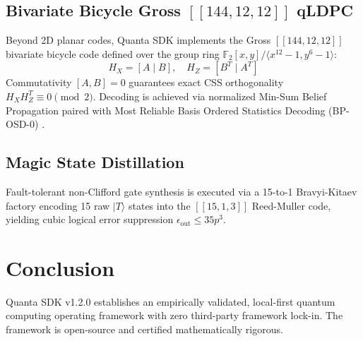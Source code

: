 \documentclass[aps,pra,reprint,superscriptaddress,amsmath,amssymb,floatfix]{revtex4-2}
\begin{document}
\subsection{Bivariate Bicycle Gross $[[144, 12, 12]]$ qLDPC}
Beyond 2D planar codes, Quanta SDK implements the Gross $[[144, 12, 12]]$ bivariate bicycle code \cite{bravyi2024high} defined over the group ring $\mathbb{F}_2[x,y]/\langle x^{12}-1, y^6-1\rangle$:
\begin{equation}
    H_X = [A \mid B], \quad H_Z = [B^T \mid A^T]
\end{equation}
Commutativity $[A, B] = 0$ guarantees exact CSS orthogonality $H_X H_Z^T \equiv 0 \pmod 2$. Decoding is achieved via normalized Min-Sum Belief Propagation paired with Most Reliable Basis Ordered Statistics Decoding (BP-OSD-0) \cite{panteleev2021degenerate, roffe2020decoding}.

\subsection{Magic State Distillation}
Fault-tolerant non-Clifford gate synthesis is executed via a 15-to-1 Bravyi-Kitaev factory \cite{bravyi2005universal} encoding 15 raw $|T\rangle$ states into the $[[15, 1, 3]]$ Reed-Muller code, yielding cubic logical error suppression $\epsilon_{\text{out}} \le 35 p^3$.

\section{Conclusion}
Quanta SDK v1.2.0 establishes an empirically validated, local-first quantum computing operating framework with zero third-party framework lock-in. The framework is open-source and certified mathematically rigorous.



\end{document}
